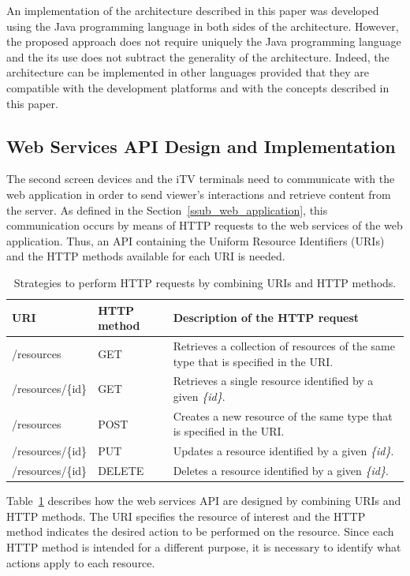\documentclass[journal]{IEEEtran}
\begin{document}
An implementation of the architecture described in this paper was developed using the Java programming language in both sides of the architecture. However, the proposed approach does not require uniquely the Java programming language and the its use does not subtract the generality of the architecture. Indeed, the architecture can be implemented in other languages provided that they are compatible with the development platforms and with the concepts described in this paper.

\subsection{Web Services API Design and Implementation}

The second screen devices and the iTV terminals need to communicate with the web application in order to send viewer's interactions and retrieve content from the server. As defined in the Section~\ref{ssub_web_application}, this communication occurs by means of HTTP requests to the web services of the web application. Thus, an API containing the Uniform Resource Identifiers (URIs) and the HTTP methods available for each URI is needed.

\begin{table}
	\caption{Strategies to perform HTTP requests by combining URIs and HTTP methods.}
	\label{table_web_serv_design}
	\centering
	\begin{tabular}{|m{1.5cm}|>{\centering}m{1cm}|m{5cm}|}
	\hline
	\textbf{URI}&\textbf{HTTP method}&\textbf{Description of the HTTP request}\tabularnewline
	\hline
	/resources & GET & Retrieves a collection of resources of the same type that is specified in the URI. \tabularnewline
	\hline
	/resources/\{id\} & GET & Retrieves a single resource identified by a given \emph{\{id\}}.\tabularnewline
	\hline
	/resources & POST & Creates a new resource of the same type that is specified in the URI.\tabularnewline
	\hline
	/resources/\{id\} & PUT & Updates a resource identified by a given \emph{\{id\}}.\tabularnewline
	\hline
	/resources/\{id\} & DELETE & Deletes a resource identified by a given \emph{\{id\}}.
	\tabularnewline
	\hline
	\end{tabular}
\end{table}

Table~\ref{table_web_serv_design} describes how the web services API are designed by combining URIs and HTTP methods. The URI specifies the resource of interest and the HTTP method indicates the desired action to be performed on the resource. Since each HTTP method is intended for a different purpose, it is necessary to identify what actions apply to each resource.
\end{document}
